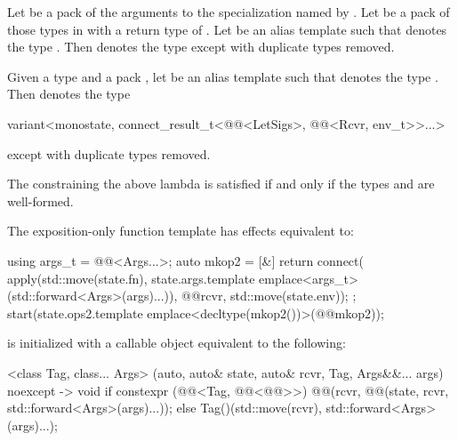 \pnum
Let  be a pack of the arguments
to the  specialization named by
.
Let  be a pack of those types in 
with a return type of .
Let  be an alias template
such that  denotes
the type .
Then  denotes
the type 
except with duplicate types removed.

\pnum
Given a type  and a pack ,
let  be an alias template
such that  denotes
the type .
Then  denotes
the type
\begin{codeblock}
variant<monostate, connect_result_t<@@<LetSigs>, @@<Rcvr, env_t>>...>
\end{codeblock}
except with duplicate types removed.

\pnum
The  constraining the above lambda is satisfied
if and only if
the types  and  are well-formed.

\pnum
The exposition-only function template 
has effects equivalent to:
\begin{codeblock}
using args_t = @@<Args...>;
auto mkop2 = [&] {
  return connect(
    apply(std::move(state.fn),
          state.args.template emplace<args_t>(std::forward<Args>(args)...)),
    @@{rcvr, std::move(state.env)});
};
start(state.ops2.template emplace<decltype(mkop2())>(@@{mkop2}));
\end{codeblock}

\pnum
{}
is initialized with a callable object equivalent to the following:
\begin{codeblock}
[]<class Tag, class... Args>
  (auto, auto& state, auto& rcvr, Tag, Args&&... args) noexcept -> void {
    if constexpr (@@<Tag, @@<@@>>) {
      @@(rcvr, @@(state, rcvr, std::forward<Args>(args)...));
    } else {
      Tag()(std::move(rcvr), std::forward<Args>(args)...);
    }
  }
\end{codeblock}

